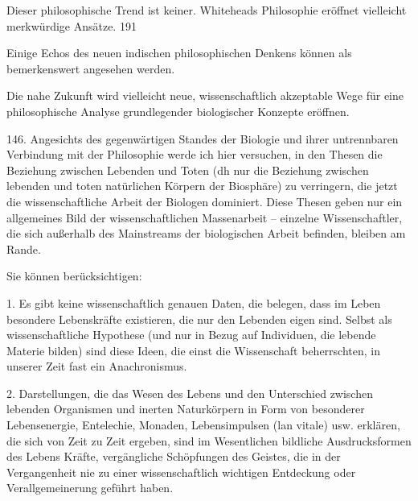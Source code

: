 \documentclass[11pt,a4paper]{book}
\begin{document}
Dieser philosophische Trend ist keiner. Whiteheads Philosophie eröffnet vielleicht merkwürdige Ansätze. 191



Einige Echos des neuen indischen philosophischen Denkens können als bemerkenswert angesehen werden.



Die nahe Zukunft wird vielleicht neue, wissenschaftlich akzeptable Wege für eine philosophische Analyse grundlegender biologischer Konzepte eröffnen.



146. Angesichts des gegenwärtigen Standes der Biologie und ihrer untrennbaren Verbindung mit der Philosophie werde ich hier versuchen, in den Thesen die Beziehung zwischen Lebenden und Toten (dh nur die Beziehung zwischen lebenden und toten natürlichen Körpern der Biosphäre) zu verringern, die jetzt die wissenschaftliche Arbeit der Biologen dominiert. Diese Thesen geben nur ein allgemeines Bild der wissenschaftlichen Massenarbeit -- einzelne Wissenschaftler, die sich außerhalb des Mainstreams der biologischen Arbeit befinden, bleiben am Rande.



Sie können berücksichtigen:



1. Es gibt keine wissenschaftlich genauen Daten, die belegen, dass im Leben besondere Lebenskräfte existieren, die nur den Lebenden eigen sind. Selbst als wissenschaftliche Hypothese (und nur in Bezug auf Individuen, die lebende Materie bilden) sind diese Ideen, die einst die Wissenschaft beherrschten, in unserer Zeit fast ein Anachronismus.



2. Darstellungen, die das Wesen des Lebens und den Unterschied zwischen lebenden Organismen und inerten Naturkörpern in Form von besonderer Lebensenergie, Entelechie, Monaden, Lebensimpulsen (lan vitale) usw. erklären, die sich von Zeit zu Zeit ergeben, sind im Wesentlichen bildliche Ausdrucksformen des Lebens Kräfte, vergängliche Schöpfungen des Geistes, die in der Vergangenheit nie zu einer wissenschaftlich wichtigen Entdeckung oder Verallgemeinerung geführt haben.
\end{document}
